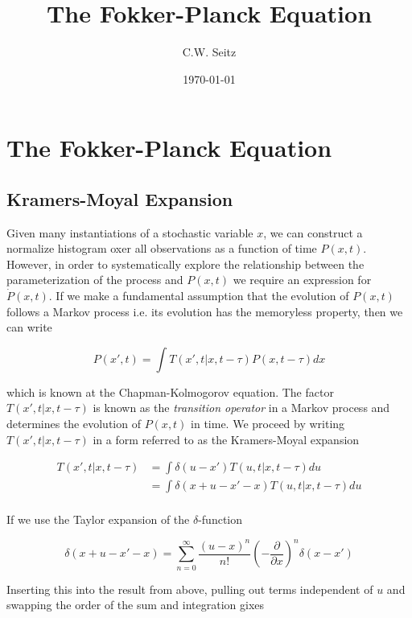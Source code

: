\documentclass{article}
\title{The Fokker-Planck Equation}
\author{C.W. Seitz}
\date{\today}
\begin{document}
\maketitle

\section{The Fokker-Planck Equation}

\subsection{Kramers-Moyal Expansion}

Given many instantiations of a stochastic variable $x$, we can construct a normalize histogram oxer all observations as a function of time $P(x,t)$. However, in order to systematically explore the relationship between the parameterization of the process and $P(x,t)$ we require an expression for $\dot{P}(x,t)$. If we make a fundamental assumption that the evolution of $P(x,t)$ follows a Markov process i.e. its evolution has the memoryless property, then we can write

\begin{equation}
P(x', t) = \int T(x', t | x, t-\tau)P(x, t-\tau)dx
\end{equation} 

which is known at the Chapman-Kolmogorov equation. The factor $T(x', t | x, t-\tau)$ is known as the \emph{transition operator} in a Markov process and determines the evolution of $P(x,t)$ in time. We proceed by writing $T(x', t | x, t-\tau)$ in a form referred to as the Kramers-Moyal expansion

\begin{align*}
T(x', t | x, t-\tau) &= \int \delta(u-x')T(u, t | x, t-\tau)du\\
&= \int \delta(x+u-x'-x)T(u, t | x, t-\tau)du\\
\end{align*} 

If we use the Taylor expansion of the $\delta$-function 

\begin{equation*}
\delta(x+u-x'-x) = \sum_{n=0}^{\infty} \frac{(u-x)^{n}}{n!}\left(-\frac{\partial}{\partial x}\right)^{n}\delta(x-x')
\end{equation*}

Inserting this into the result from above, pulling out terms independent of $u$ and swapping the order of the sum and integration gixes
\end{document}
